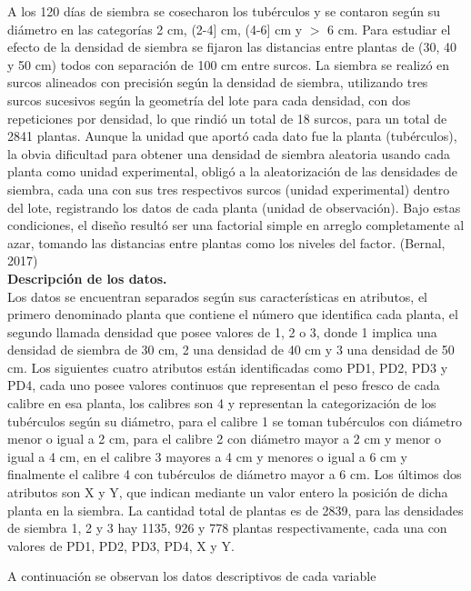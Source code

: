 A los 120 días de siembra se cosecharon los tubérculos y se contaron según su diámetro en las categorías 2 cm, (2-4] cm, (4-6] cm y $>$ 6 cm. Para estudiar el efecto de la densidad de siembra se fijaron las distancias entre plantas de (30, 40 y 50 cm) todos con separación de 100 cm entre surcos. La siembra se realizó en surcos alineados con precisión según la densidad de siembra, utilizando tres surcos sucesivos según la geometría del lote para cada densidad, con dos repeticiones por densidad, lo que rindió un total de 18 surcos, para un total de 2841 plantas. Aunque la unidad que aportó cada dato fue la planta (tubérculos), la obvia dificultad para obtener una densidad de siembra aleatoria usando cada planta como unidad experimental, obligó a la aleatorización de las densidades de siembra, cada una con sus tres respectivos surcos (unidad experimental) dentro del lote, registrando los datos de cada planta (unidad de observación). Bajo estas condiciones, el diseño resultó ser una factorial simple en arreglo completamente al azar, tomando las distancias entre plantas como los niveles del factor. (Bernal, 2017)\\

\noindent
\textbf{Descripción de los datos.}\\

Los datos se encuentran separados según sus características en atributos, el primero denominado planta que contiene el número que identifica cada planta, el segundo llamada densidad que posee valores de 1, 2 o 3, donde 1 implica una densidad de siembra de 30 cm, 2 una densidad de 40 cm y 3 una densidad de 50 cm. Los siguientes cuatro atributos están identificadas como PD1, PD2, PD3 y PD4, cada uno posee valores continuos que representan el peso fresco de cada calibre en esa planta, los calibres son 4 y representan la categorización de los tubérculos según su diámetro, para el calibre 1 se toman tubérculos con diámetro menor o igual a 2 cm, para el calibre 2 con diámetro mayor a 2 cm y menor o igual a 4 cm, en el calibre 3 mayores a 4 cm y menores o igual a 6 cm y finalmente el calibre 4 con tubérculos de diámetro mayor a 6 cm. Los últimos dos atributos son X y Y, que indican mediante un valor entero la posición de dicha planta en la siembra. La cantidad total de plantas es de 2839, para las densidades de siembra 1, 2 y 3 hay 1135, 926 y 778 plantas respectivamente, cada una con valores de PD1, PD2, PD3, PD4, X y Y.

A continuación se observan los datos descriptivos de cada variable

